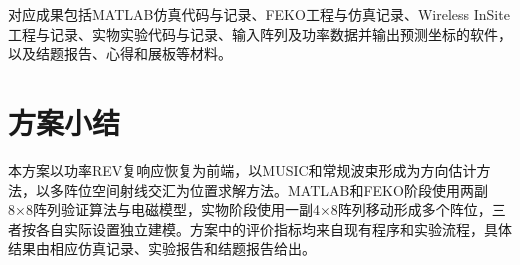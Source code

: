 \documentclass[UTF8,a4paper,12pt]{ctexart}
\begin{document}
对应成果包括MATLAB仿真代码与记录、FEKO工程与仿真记录、Wireless InSite工程与记录、实物实验代码与记录、输入阵列及功率数据并输出预测坐标的软件，以及结题报告、心得和展板等材料。

\section{方案小结}

本方案以功率REV复响应恢复为前端，以MUSIC和常规波束形成为方向估计方法，以多阵位空间射线交汇为位置求解方法。MATLAB和FEKO阶段使用两副8×8阵列验证算法与电磁模型，实物阶段使用一副4×8阵列移动形成多个阵位，三者按各自实际设置独立建模。方案中的评价指标均来自现有程序和实验流程，具体结果由相应仿真记录、实验报告和结题报告给出。
\end{document}
